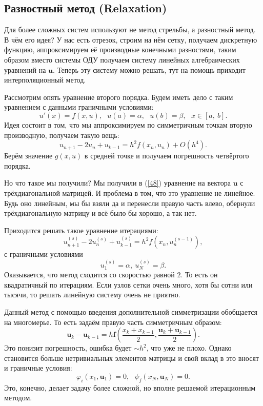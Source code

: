 \documentclass[a4paper,9pt,russian]{article}
\begin{document}
\subsection{Разностный метод (Relaxation)}
    Для более сложных систем используют не метод стрельбы, а разностный метод. В чём его идея? {У нас есть отрезок, строим на нём сетку, получаем дискретную функцию, аппроксимируем её производные конечными разностями, таким образом вместо системы ОДУ получаем систему линейных алгебраических уравнений на $\boldsymbol u$. Теперь эту систему можно решать, тут на помощь приходит интерполяционный метод.}\par
    Рассмотрим опять уравнение второго порядка. Будем иметь дело с таким уравнением с данными граничными условиями:
    \begin{equation}
     u'(x) = f(x, u),\ \ \ u(a)=\alpha,\ \ \ u(b) = \beta, \ \ \ x \in [a,\ b].
    \end{equation}
    Идея состоит в том, что мы аппроксимируем по симметричным точкам вторую производную, получаем такую вещь:
    \begin{equation}\label{48}
     u_{n+1} - 2 u_n + u_{k-1} = h^2f(x_n, u_n) + O(h^4).
    \end{equation}
    Берём значение $g(x, u)$ в средней точке и получаем погрешность четвёртого порядка.\par
    Но что такое мы получили? Мы получили в (\ref{48}) уравнение на вектора $\boldsymbol u$ с трёхдиагональной матрицей. И проблема в том, что это уравнение не линейное. Будь оно линейным, мы бы взяли да и перенесли правую часть влево, обернули трёхдиагональную матрицу и всё было бы хорошо, а так нет.\par
    Приходится решать такое уравнение итерациями:
    \begin{equation}
     u_{n+1}^{(s)} - 2 u_n^{(s)} + u_{k-1}^{(s)} = h^2f(x_n, u_n^{(s-1)}),
    \end{equation}
    с граничными условиями$$u_1^{(s)}=\alpha,\ u_N^{(s)} = \beta.$$
    Оказывается, что метод сходится со скоростью равной $2$. То есть он квадратичный по итерациям. Если узлов сетки очень много, хотя бы сотни или тысячи, то решать линейную систему очень не приятно.\par
    Данный метод с помощью введения дополнительной симметризации обобщается на многомерье. То есть задаём правую часть симметричным образом:
    \begin{equation}
     \boldsymbol u_k - \boldsymbol u_{k-1} = h \boldsymbol f(\frac{x_k + x_{k-1}}{2}, \frac{\boldsymbol u_k + \boldsymbol u_{k-1}}2).
    \end{equation}
    Это понизит погрешность, ошибка будет $\sim h^2$, что уже не плохо. Однако становится больше нетривиальных элементов матрицы и свой вклад в это вносят и граничные условия:
    \begin{equation}
     \varphi_i (x_1,\boldsymbol u_1) = 0,\ \ \ \psi_j (x_N,\boldsymbol u_N) = 0.
    \end{equation}
    Это, конечно, делает задачу более сложной, но вполне решаемой итерационным методом.
\end{document}
